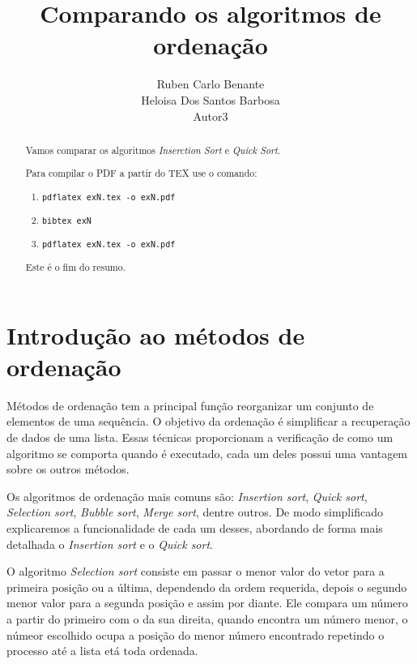 \documentclass[a4paper,10pt]{article} %
\title{Comparando os algoritmos de ordenação}
\author{Ruben Carlo Benante \\ Heloisa Dos Santos Barbosa \\ Autor3}
\begin{document}
\maketitle

\begin{abstract}

Vamos comparar os algoritmos \textit{Inserction Sort} e \textit{Quick Sort}.

Para compilar o PDF a partir do TEX use o comando:

\begin{enumerate}
 \item \texttt{pdflatex exN.tex -o exN.pdf}
 \item \texttt{bibtex exN}
 \item \texttt{pdflatex exN.tex -o exN.pdf}
\end{enumerate}

Este é o fim do resumo.

\end{abstract}


\section{Introdução ao métodos de ordenação}

    Métodos de ordenação tem a principal função reorganizar um conjunto de elementos de uma sequência. O objetivo da ordenação é simplificar a recuperação de dados de uma lista. Essas técnicas proporcionam a verificação de como um algoritmo se comporta quando é executado, cada um deles possui uma vantagem sobre os outros métodos.

    Os algoritmos de ordenação mais comuns são: \textit{Insertion sort},  \textit{Quick sort},  \textit{Selection sort},  \textit{Bubble sort},  \textit{Merge sort}, dentre outros. De modo simplificado explicaremos a funcionalidade de cada um desses, abordando de forma mais detalhada o \textit{Insertion sort} e o \textit{Quick sort}.

    O algoritmo \textit{Selection sort} consiste em passar o menor valor do vetor para a primeira posição ou a última, dependendo da ordem requerida, depois o segundo menor valor para a segunda posição e assim por diante. Ele compara um número a partir do primeiro com o da sua direita, quando encontra um número menor, o númeor escolhido ocupa a posição do menor número encontrado repetindo o processo até a lista etá toda ordenada.
    
\end{document}
